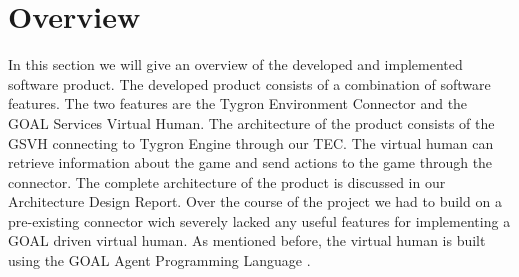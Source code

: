 \section{Overview}
In this section we will give an overview of the developed and implemented software product. The developed product consists of a combination of software features. The two features are the Tygron Environment Connector and the GOAL Services Virtual Human. The architecture of the product consists of the GSVH connecting to Tygron Engine through our TEC. The virtual human can retrieve information about the game and send actions to the game through the connector. The complete architecture of the product is discussed in our Architecture Design Report\cite{CTD16}. Over the course of the project we had to build on a pre-existing connector wich severely lacked any useful features for implementing a GOAL driven virtual human. As mentioned before, the virtual human is built using the GOAL Agent Programming Language \cite{GOAL16}. 

\subsection{}

\newpage